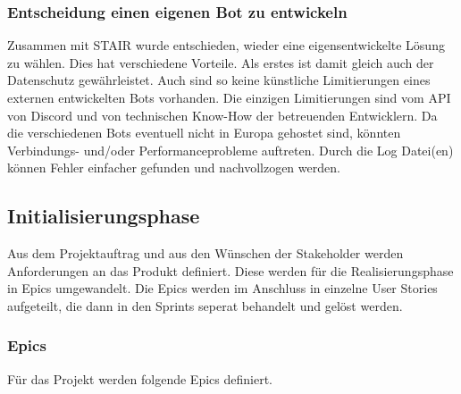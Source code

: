 \documentclass[a4paper, table]{article}
\begin{document}
\subsubsection*{Entscheidung einen eigenen Bot zu entwickeln}
Zusammen mit STAIR wurde entschieden, wieder eine eigensentwickelte Lösung zu wählen.
Dies hat verschiedene Vorteile.
Als erstes ist damit gleich auch der Datenschutz gewährleistet.
Auch sind so keine künstliche Limitierungen eines externen entwickelten Bots vorhanden.
Die einzigen Limitierungen sind vom API von Discord und von technischen Know-How der betreuenden Entwicklern.
Da die verschiedenen Bots eventuell nicht in Europa gehostet sind, könnten Verbindungs- und/oder Performanceprobleme auftreten.
Durch die Log Datei(en) können Fehler einfacher gefunden und nachvollzogen werden.
\newpage
\subsection{Initialisierungsphase}
Aus dem Projektauftrag und aus den Wünschen der Stakeholder werden Anforderungen an das Produkt definiert.
Diese werden für die Realisierungsphase in Epics umgewandelt.
Die Epics werden im Anschluss in einzelne User Stories aufgeteilt, die dann in den Sprints seperat behandelt und gelöst werden.

\subsubsection{Epics}\label{Epics}
Für das Projekt werden folgende Epics definiert.
\end{document}
